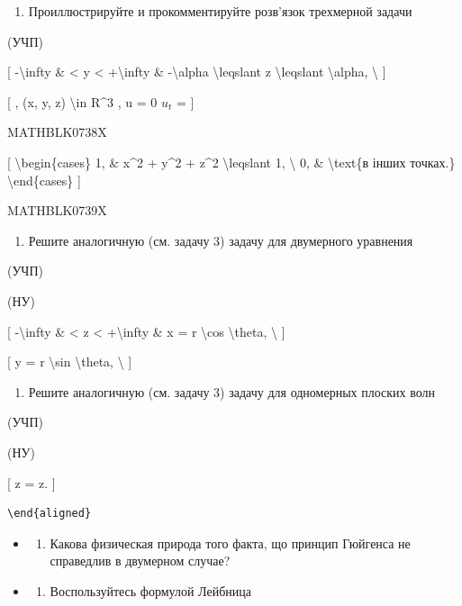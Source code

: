 \documentclass[
]{article}
\providecommand{\tightlist}{%
  \setlength{\itemsep}{0pt}\setlength{\parskip}{0pt}}
\begin{document}
{{\begin{enumerate}
\def\labelenumi{\arabic{enumi}.}
\setcounter{enumi}{2}
\tightlist
\item
  Проиллюстрируйте и прокомментируйте розв'язок трехмерной задачи
\end{enumerate}

(УЧП)

{[} -\textbackslash infty \& \textless{} y \textless{}
+\textbackslash infty \& -\textbackslash alpha \textbackslash leqslant z
\textbackslash leqslant \textbackslash alpha, \textbackslash{} {]}

{[} , (x, y, z) \textbackslash in R\^{}3 , u = 0 \(u_t\) = {]}

MATHBLK0738X

{[} \textbackslash begin\{cases\} 1, \& x\^{}2 + y\^{}2 + z\^{}2
\textbackslash leqslant 1, \textbackslash{} 0, \& \textbackslash text\{в
інших точках.\} \textbackslash end\{cases\} {]}

MATHBLK0739X

\begin{enumerate}
\def\labelenumi{\arabic{enumi}.}
\setcounter{enumi}{3}
\tightlist
\item
  Решите аналогичную (см. задачу 3) задачу для двумерного уравнения
\end{enumerate}

(УЧП)

(НУ)

{[} -\textbackslash infty \& \textless{} z \textless{}
+\textbackslash infty \& x = r \textbackslash cos \textbackslash theta,
\textbackslash{} {]}

{[} y = r \textbackslash sin \textbackslash theta, \textbackslash{} {]}

\begin{enumerate}
\def\labelenumi{\arabic{enumi}.}
\setcounter{enumi}{4}
\tightlist
\item
  Решите аналогичную (см. задачу 3) задачу для одномерных плоских волн
\end{enumerate}

(УЧП)

(НУ)

{[} z = z. {]}

\begin{verbatim}
\end{aligned}
\end{verbatim}

\begin{itemize}
\tightlist
\item
  \begin{enumerate}
  \def\labelenumi{\arabic{enumi}.}
  \setcounter{enumi}{5}
  \tightlist
  \item
    Какова физическая природа того факта, що принцип Гюйгенса не
    справедлив в двумерном случае?
  \end{enumerate}
\item
  \begin{enumerate}
  \def\labelenumi{\arabic{enumi}.}
  \setcounter{enumi}{6}
  \tightlist
  \item
    Воспользуйтесь формулой Лейбница
  \end{enumerate}
\end{itemize}

}}
\end{document}
